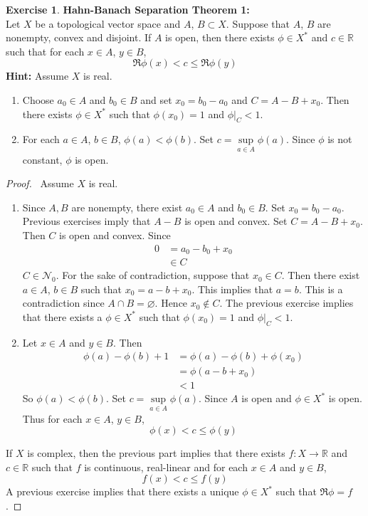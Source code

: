 \documentclass[12pt]{amsart}
\theoremstyle{definition}
\newtheorem{ex}[definition]{Exercise}
\newcommand{\R}{\mathbb{R}}
\newcommand{\MN}{\mathcal{N}}
\begin{document}
	\begin{ex} \textbf{Hahn-Banach Separation Theorem 1:} \\
		Let $X$ be a topological vector space and $A$, $B \subset X$. Suppose that $A$, $B$ are nonempty, convex and disjoint. If $A$ is open, then there exists $\phi \in X^*$ and $c \in \R$ such that for each $x \in A$, $y \in B$, $$\Re \phi(x) < c \leq \Re \phi(y)$$
		\textbf{Hint:} Assume $X$ is real.
		\begin{enumerate}
			\item Choose $a_0 \in A$ and $b_0 \in B$ and set $x_0 = b_0 - a_0$ and $C = A - B + x_0$. Then there exists $\phi \in X^*$ such that $\phi(x_0) = 1$ and $\phi|_C < 1$.
			\item For each $a \in A$, $b \in B$, $\phi(a) < \phi(b)$. Set $c = \sup\limits_{a \in A}\phi(a)$. Since $\phi$ is not constant, $\phi$ is open.
		\end{enumerate}
	\end{ex}
	
	\begin{proof}\
		Assume $X$ is real.
		\begin{enumerate}
			\item Since $A, B$ are nonempty, there exist $a_0 \in A$ and $b_0 \in B$. Set $x_0 = b_0 - a_0$. Previous exercises imply that $A - B$ is open and convex. Set $C = A - B + x_0$. Then $C$ is open and convex. 
			Since  
			\begin{align*}
				0 
				&= a_0 - b_0 + x_0 \\
				&\in C
			\end{align*}
			$C \in \MN_0$. For the sake of contradiction, suppose that $x_0 \in C$. Then there exist $a \in A$, $b \in B$ such that $x_0 = a - b + x_0$. This implies that $a = b$. This is a contradiction since $A \cap B = \varnothing$. Hence $x_0 \not \in C$. The previous exercise implies that there exists a $\phi \in X^*$ such that $\phi(x_0) = 1$ and  $\phi|_C < 1$. 
			\item Let $x \in A$ and $y \in B$. Then 
			\begin{align*}
				\phi(a) - \phi(b) + 1
				&= \phi(a) - \phi(b) + \phi(x_0) \\
				&= \phi(a - b + x_0) \\
				& < 1
			\end{align*}
			So $\phi(a) < \phi(b)$. Set $c = \sup\limits_{a \in A}\phi(a)$. Since $A$ is open and $\phi \in X^*$ is open. Thus for each $x \in A$, $y \in B$, 
			$$\phi(x) < c \leq \phi(y)$$
		\end{enumerate}
	If $X$ is complex, then the previous part implies that there exists $f:X \rightarrow \R$ and $c \in \R$ such that $f$ is continuous, real-linear and for each $x \in A$ and $y \in B$, 
	$$f(x) < c \leq f(y)$$ 
	A previous exercise implies that there exists a unique $\phi \in X^*$ such that $\Re \phi = f$.
	\end{proof}
	
\end{document}
